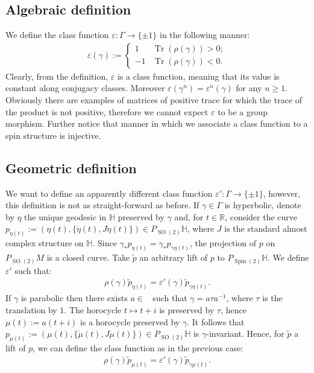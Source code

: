\documentclass[12pt]{amsart}
\theoremstyle{definition}
\def\RR{{\mathbb R}}
\def\HH{{\mathbb{H}}}
\def\g{{\gamma}}
\def\G{{\Gamma}}
\DeclareMathOperator{\tr}{Tr}
\DeclareMathOperator{\psl}{PSL_2(\mathbb{R})}
\newcommand{\so}{\operatorname{SO}}
\newcommand{\spin}{\operatorname{Spin}}
\begin{document}
\subsection{Algebraic definition}\label{algebraicInterpretation}
We define the class function $\varepsilon: \G \longrightarrow \{ \pm 1 \}$ in the following manner:
\begin{align*}
\varepsilon(\g) := 
\begin{cases}
1 & \tr(\rho(\g)) > 0 ;\\
-1 & \tr(\rho(\g)) < 0.
\end{cases}
\end{align*}
Clearly, from the definition, $\varepsilon$ is a class function, meaning that its value is constant along conjugacy classes. Moreover $\varepsilon(\g^n) = \varepsilon^n(\g)$ for any $n\geq 1$. Obviously there are examples of matrices of positive trace for which the trace of the product is not positive, therefore we cannot expect $\varepsilon$ to be a group morphism. Further notice that manner in which we associate a class function to a spin structure is injective.

\subsection{Geometric definition}\label{geometricInterpretation}
We want to define an apparently different class function $\varepsilon':\G \longrightarrow \{ \pm 1 \}$, however, this definition is not as straight-forward as before.
If $\g\in\G$ is hyperbolic, denote by $\eta$ the unique geodesic in $\HH$ preserved by $\g$ and, for $t\in \RR$, consider the curve $p_{\eta(t)}:= (\eta(t), \{ \dot{\eta}(t), J \dot{\eta}(t)\}) \in P_{\so(2)}\HH$, where $J$ is the standard almost complex structure on $\HH$. Since $\g_*p_{\eta(t)} = \g_*p_{\g\eta(t)}$, the projection of $p$ on $P_{\so(2)}M$ is a closed curve. Take $\tilde{p}$ an arbitrary lift of $p$ to $P_{\spin(2)}\HH$. We define $\varepsilon'$ such that:
\begin{align*}
\rho(\g)\tilde{p}_{\eta(t)} = \varepsilon'(\g)\tilde{p}_{\g\eta(t)}.
\end{align*}
If $\g$ is parabolic then there exists $a\in\psl$ such that $\g=a\tau a^{-1}$, where $\tau$ is the translation by $1$. 
The horocycle $t\mapsto t+i$ is preserved by $\tau$, hence $\mu(t) := a(t+i)$ is a horocycle preserved by $\g$.
It follows that $p_{\mu (t)}:=(\mu(t), \{\dot{\mu}(t),J\dot{\mu}(t) \}) \in P_{\so(2)}\HH$ is $\g$-invariant. Hence, for $\tilde{p}$ a lift of $p$, we can define the class function as in the previous case:
\begin{align*}
\rho(\g)\tilde{p}_{\mu(t)} = \varepsilon'(\g)\tilde{p}_{\g \mu(t)}.
\end{align*}
\end{document}
